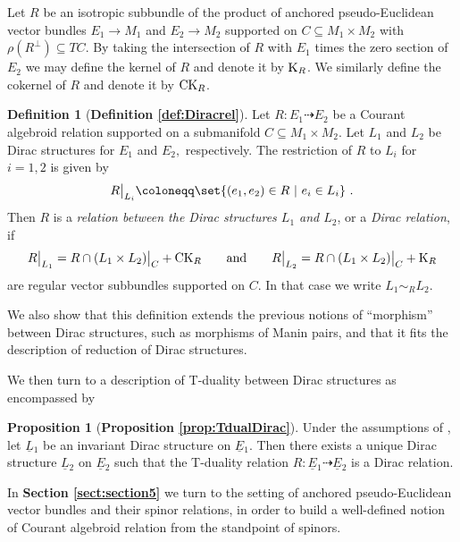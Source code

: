 \documentclass[a4paper, reqno, 11pt]{amsart}
\numberwithin{equation}{section}
\theoremstyle{definition}
\newtheorem{definition}[equation]{Definition}
\newtheorem{proposition}[equation]{Proposition}
\newcommand{\red}[1]{\underline{#1}}
\newcommand{\rel}{\dashrightarrow}
\theoremstyle{remark}
\begin{document}
Let $R$ be an isotropic subbundle of the product of anchored pseudo-Euclidean vector bundles $E_1 \to M_1$ and $E_2 \to M_2$ supported on $C \subseteq M_1 \times M_2$ with $\rho(R^\perp) \subseteq TC$. By taking the intersection of $R$ with $E_1$ times the zero section of $E_2$ we may define the kernel of $R$ and denote it by ${\rm K}_R$. We similarly define the cokernel of $R$ and denote it by ${\rm CK}_R$. 

\begin{definition}[\textbf{Definition \ref{def:Diracrel}}]
   Let $R \colon E_1 \dashrightarrow E_2$ be a Courant algebroid relation supported on a submanifold $C \subseteq M_1 \times M_2$.  Let $L_1$ and $L_2$ be Dirac structures for $E_1$ and $E_2,$ respectively. The restriction of $R$ to $L_i$ for $i=1,2$ is given by
\begin{align}
R \big\rvert_{L_i} \coloneqq \set{(e_1, e_2) \in R \ | \ e_i \in L_i} \ .  
\end{align}
Then $R$ is a \emph{relation between the Dirac structures $L_1$ and $L_2$}, or a \emph{Dirac relation}, if
\begin{align}
R \big\rvert_{L_1} = R\cap (L_1 \times L_2) \big\rvert_C + {\rm CK}_R \qquad \text{and} \qquad  R\big\rvert_{L_2} = R\cap (L_1 \times L_2) \big\rvert_C + {\rm K}_R  
\end{align}
are regular vector subbundles supported on $C.$ In that case we write $L_1\sim_R L_2$.
\end{definition}

We also show that this definition extends the previous notions of ``morphism'' between Dirac structures, such as morphisms of Manin pairs, and that it fits the description of reduction of Dirac structures.

We then turn to a description of T-duality between Dirac structures as encompassed by

\begin{proposition}[\textbf{Proposition \ref{prop:TdualDirac}}]
  Under the assumptions of \cite[Theorem 5.27]{DeFraja:2023fhe}, let $\red L{}_1$ be an invariant Dirac structure on $\red E{}_1$. Then there exists a unique Dirac structure $\red L{}_2$ on $\red E{}_2$ such that the T-duality relation $R:\red E{}_1\rel\red E{}_2$ is a Dirac relation.  
\end{proposition}

In \textbf{Section \ref{sect:section5}} we turn to the setting of anchored pseudo-Euclidean vector bundles and their spinor relations, in order to build a well-defined notion of Courant algebroid relation from the standpoint of spinors.
\end{document}
